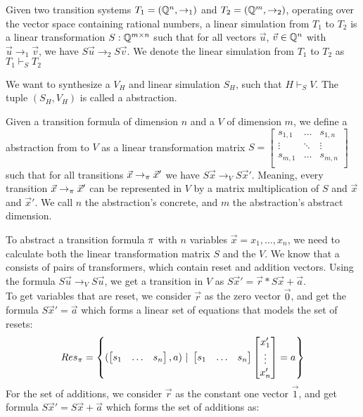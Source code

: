\begin{mydef}
	Given two transition systems $T_1 = ( \mathbb{Q} ^n, \rightarrow_1)$ and $T_2 = ( \mathbb{Q} ^m, \rightarrow_2)$, operating over the vector space containing rational numbers, a linear simulation from $T_1$ to $T_2$ is a linear transformation $S:  \mathbb{Q} ^{m \times n}$ such that for all vectors $\vec{u}$, $\vec{v} \in  \mathbb{Q} ^n$ with $\vec{u} \rightarrow_1 \vec{v}$, we have $S\vec{u} \rightarrow_2 S\vec{v}$. We denote the linear simulation from $T_1$ to $T_2$ as $T_1 \vdash_S T_2$
\end{mydef}
We want to synthesize a \qvasr $V_H$ and linear simulation $S_H$, such that $H \vdash_S V$. The tuple $(S_H, V_H)$ is called a \qvasr abstraction.
\begin{mydef}
	Given a transition formula \trf of dimension $n$ and a \qvasr $V$ of dimension $m$, we define a \qvasr abstraction from \trf to $V$ as a linear transformation matrix 
	$S = 
	\begin{bmatrix}
		s_{1 ,1} & \ldots & s_{1, n} \\
		\vdots & \ddots & \vdots \\
		s_{m ,1} & \ldots & s_{m, n} \\
	\end{bmatrix}$ 
	such that for all transitions $\vec{x} \rightarrow_\pi \vec{x}'$ we have $S\vec{x} \rightarrow_V S\vec{x}'$. Meaning, every transition $\vec{x} \rightarrow_\pi \vec{x}'$ can be represented in $V$ by a matrix multiplication of $S$ and $\vec{x}$ and $\vec{x}'$. We call $n$ the abstraction's concrete, and $m$ the abstraction's abstract dimension. 
\end{mydef}
To abstract a transition formula $\pi$ with $n$ variables $\vec{x} = x_1, \ldots, x_n$, we need to calculate both the linear transformation matrix $S$ and the \qvasr $V$. We know that a \qvasr consists of pairs of transformers, which contain reset and addition vectors. Using the formula $S \vec{u} \rightarrow_V S\vec{u}$, we get a transition in $V$ as $S\vec{x}' = \vec{r}*S\vec{x} + \vec{a}$. \\ To get variables that are reset, we consider $\vec{r}$ as the zero vector $\vec{0}$, and get the formula $S\vec{x}' = \vec{a}$ which forms a linear set of equations that models the set of resets:
\begin{equation*}
	Res_\pi = \left\{ (\begin{bmatrix} s_1 & \ldots &s_n \end{bmatrix}, a)\ |\ \begin{bmatrix} s_1 & \ldots &s_n \end{bmatrix} \begin{bmatrix} x_1' \\ \vdots \\ x_n' \end{bmatrix} = a \right\}	
\end{equation*}
For the set of additions, we consider $\vec{r}$ as the constant one vector $\vec{1}$, and get formula $S\vec{x}' = S\vec{x} + \vec{a}$ which forms the set of additions as:
